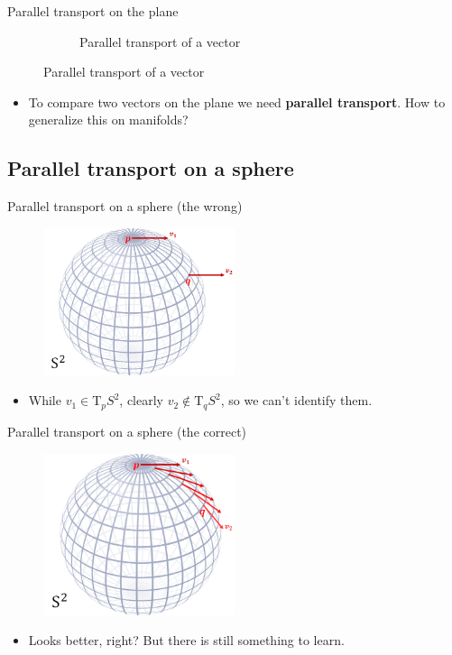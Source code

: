 \documentclass{beamer}
\begin{document}
\begin{frame}{Parallel transport on the plane}
\begin{figure}[h!]
\begin{subfigure}{.5\textwidth}
            \caption{Parallel transport of a vector}
            \label{fig:sub4}
        \end{subfigure}  
    \end{figure}
    \begin{itemize}
        \item To compare two vectors on the plane we need \textbf{parallel transport}. How to generalize this on manifolds?
    \end{itemize}
\end{frame}


\subsection{Parallel transport on a sphere}
\begin{frame}{Parallel transport on a sphere (the wrong)}
\begin{figure}[h!]
    \includegraphics[width=0.5\textwidth]{images/PT_sphere_wrong.png}
\end{figure}    
\begin{itemize}
    \item While $v_1 \in \text{T}_p S^2$, clearly $v_2 \notin \text{T}_q S^2$, so we can't identify them. 
\end{itemize}
\end{frame}

\begin{frame}{Parallel transport on a sphere (the correct)}
    \begin{figure}[h!]
        \includegraphics[width=0.5\textwidth]{images/PT_sphere_right.png}
    \end{figure}    
    \begin{itemize}
        \item Looks better, right? But there is still something to learn. 
    \end{itemize}
\end{frame}
    
\end{document}
